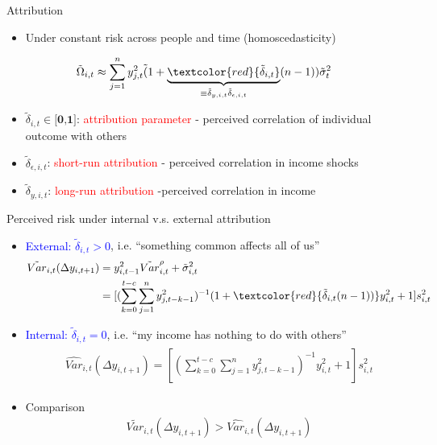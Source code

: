 \documentclass{beamer}
\begin{document}
\begin{frame}{Attribution}
	
	\begin{itemize}
		\item Under constant risk across people and time (homoscedasticity)
	\end{itemize}
	\begin{eqnarray}
	\begin{split}
	\tilde \Omega_{i,t}  & \approx \sum^{n}_{j=1}y^2_{j,t} \tilde (1+\underbrace{\textcolor{red}{\tilde \delta_{i,t}}}_{\equiv \tilde \delta_{y,i,t}\tilde \delta_{\epsilon,i,t}}(n-1)) \tilde \sigma^2_{t} 
	\end{split}
	\end{eqnarray}
	\begin{itemize}
			\item $\tilde \delta_{i,t} \in \textbf{[0,1]}$: \textcolor{red}{attribution parameter} - perceived correlation of individual outcome with others 
		\item $\tilde \delta_{\epsilon, i,t}$: \textcolor{red}{short-run attribution} -  perceived correlation in income shocks 
		\item $\tilde \delta_{y, i,t}$: \textcolor{red}{long-run attribution} -perceived correlation in income 
	
	\end{itemize}
\end{frame}



\begin{frame}{Perceived risk under internal  v.s. external attribution}
	
	\begin{itemize}
		\item \textcolor{blue}{External: $\tilde \delta_{i,t} >0$}, i.e. ``something common affects all of us''
	\begin{eqnarray}
	\begin{split}
	\tilde {Var}_{i,t}(\Delta y_{i,t+1}) & = y_{i,t-1}^2 \tilde{Var}^{\rho}_{i,t} + \tilde{\sigma}^2_{i,t} \\
	& = [(\sum^{t-c}_{k=0}\sum^{n}_{j=1}y^2_{j,t-k-1})^{-1}(1+\textcolor{red}{ \tilde\delta_{i,t}(n-1))}y^2_{i,t} + 1] s^2_{i,t}
	\end{split}
	\end{eqnarray}
		\item \textcolor{blue}{Internal: $\tilde \delta_{i,t} =0$}, i.e. ``my income has nothing to do with others''
		\begin{eqnarray}
	\begin{split}
	\widehat{Var}_{i,t}(\Delta y_{i,t+1}) = [(\sum^{t-c}_{k=0}\sum^{n}_{j=1}y^2_{j,t-k-1})^{-1}y^2_{i,t} + 1] s^2_{i,t} 
		\end{split}
	\end{eqnarray}
		\item Comparison
		\begin{eqnarray}
		\tilde {Var}_{i,t}(\Delta y_{i,t+1}) > \widehat{Var}_{i,t}(\Delta y_{i,t+1})
		\end{eqnarray}
	\end{itemize}
	
\end{frame}
\end{document}
